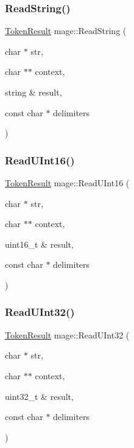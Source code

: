\hypertarget{namespacemage_aa4f9ae6b6aa815ab879d4ea1f0453172}{}\label{namespacemage_aa4f9ae6b6aa815ab879d4ea1f0453172} 
\subsubsection{\texorpdfstring{Read\+String()}{ReadString()}}
{\footnotesize\ttfamily \hyperlink{namespacemage_a2178ba2411db5912f41b2e7698c2037d}{Token\+Result} mage\+::\+Read\+String (\begin{DoxyParamCaption}\item[{char $\ast$}]{str,  }\item[{char $\ast$$\ast$}]{context,  }\item[{string \&}]{result,  }\item[{const char $\ast$}]{delimiters }\end{DoxyParamCaption})}

\hypertarget{namespacemage_a8e94422a0e962b98b2555bc95c6eff4c}{}\label{namespacemage_a8e94422a0e962b98b2555bc95c6eff4c} 
\subsubsection{\texorpdfstring{Read\+U\+Int16()}{ReadUInt16()}}
{\footnotesize\ttfamily \hyperlink{namespacemage_a2178ba2411db5912f41b2e7698c2037d}{Token\+Result} mage\+::\+Read\+U\+Int16 (\begin{DoxyParamCaption}\item[{char $\ast$}]{str,  }\item[{char $\ast$$\ast$}]{context,  }\item[{uint16\+\_\+t \&}]{result,  }\item[{const char $\ast$}]{delimiters }\end{DoxyParamCaption})}

\hypertarget{namespacemage_aaa46d4e55d14328f2c97ffbcd9167727}{}\label{namespacemage_aaa46d4e55d14328f2c97ffbcd9167727} 
\subsubsection{\texorpdfstring{Read\+U\+Int32()}{ReadUInt32()}}
{\footnotesize\ttfamily \hyperlink{namespacemage_a2178ba2411db5912f41b2e7698c2037d}{Token\+Result} mage\+::\+Read\+U\+Int32 (\begin{DoxyParamCaption}\item[{char $\ast$}]{str,  }\item[{char $\ast$$\ast$}]{context,  }\item[{uint32\+\_\+t \&}]{result,  }\item[{const char $\ast$}]{delimiters }\end{DoxyParamCaption})}


